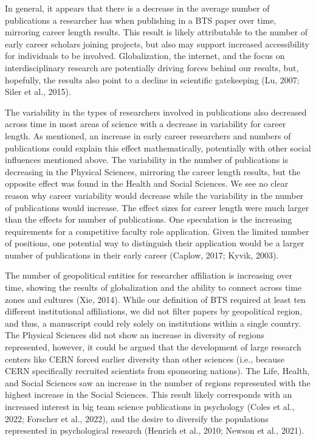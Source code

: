 \documentclass[
  man,mask,floatsintext]{apa7}
\begin{document}
In general, it appears that there is a decrease in the average number of publications a researcher has when publishing in a BTS paper over time, mirroring career length results. This result is likely attributable to the number of early career scholars joining projects, but also may support increased accessibility for individuals to be involved. Globalization, the internet, and the focus on interdisciplinary research are potentially driving forces behind our results, but, hopefully, the results also point to a decline in scientific gatekeeping (Lu, 2007; Siler et al., 2015).

The variability in the types of researchers involved in publications
also decreased across time in most areas of science with a decrease in
variability for career length. As mentioned, an increase in early career
researchers and numbers of publications could explain this effect
mathematically, potentially with other social influences mentioned
above. The variability in the number of publications is decreasing in
the Physical Sciences, mirroring the career length results, but the
opposite effect was found in the Health and Social Sciences. We see no
clear reason why career variability would decrease while the variability
in the number of publications would increase. The effect sizes for
career length were much larger than the effects for number of
publications. One speculation is the increasing requirements for a
competitive faculty role application. Given the limited number of
positions, one potential way to distinguish their application would be a
larger number of publications in their early career (Caplow, 2017; Kyvik, 2003).

The number of geopolitical entities for researcher affiliation is
increasing over time, showing the results of globalization and the
ability to connect across time zones and cultures (Xie, 2014). While our
definition of BTS required at least ten different
institutional affiliations, we did not filter papers by geopolitical
region, and thus, a manuscript could rely solely on institutions within
a single country. The Physical Sciences did not show an increase in
diversity of regions represented, however, it could be argued that the
development of large research centers like CERN forced earlier diversity
than other sciences (i.e., because CERN specifically recruited
scientists from sponsoring nations). The Life, Health, and Social
Sciences saw an increase in the number of regions represented with the
highest increase in the Social Sciences. This result likely corresponds
with an increased interest in big team science publications in
psychology (Coles et al., 2022; Forscher et al., 2022), and the desire to diversify the
populations represented in psychological research (Henrich et al., 2010; Newson et al., 2021).
\end{document}
